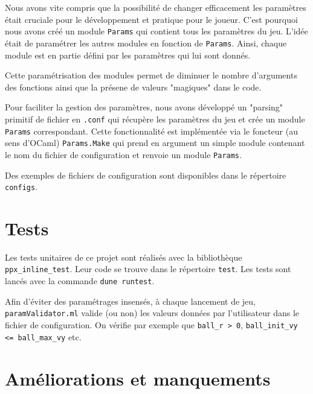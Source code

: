 \documentclass[french]{template}
\begin{document}
Nous avons vite compris que la possibilité de changer efficacement les paramètres était cruciale pour le développement et pratique pour le joueur. C'est pourquoi nous avons créé un module \texttt{Params} qui contient tous les paramètres du jeu. L'idée était de paramétrer les autres modules en fonction de \texttt{Params}. Ainsi, chaque module est en partie défini par les paramètres qui lui sont donnés.

Cette paramétrisation des modules permet de diminuer le nombre d'arguments des fonctions ainsi que la présene de valeurs "magiques" dans le code.

Pour faciliter la gestion des paramètres, nous avons développé un "parsing" primitif de fichier en \texttt{.conf} qui récupère les paramètres du jeu et crée un module \texttt{Params} correspondant. Cette fonctionnalité est implémentée via le foncteur (au sens d'OCaml) \texttt{Params.Make} qui prend en argument un simple module contenant le nom du fichier de configuration et renvoie un module \texttt{Params}.

Des exemples de fichiers de configuration sont disponibles dans le répertoire \texttt{configs}.

\section{Tests}

Les tests unitaires de ce projet sont réalisés avec la bibliothèque \texttt{ppx\_inline\_test}. Leur code se trouve dans le répertoire \texttt{test}. Les tests sont lancés avec la commande \texttt{dune runtest}.

Afin d'éviter des paramétrages insensés, à chaque lancement de jeu, \texttt{paramValidator.ml} valide (ou non) les valeurs données par l'utilisateur dans le fichier de configuration. On vérifie par exemple que \texttt{ball\_r > 0}, \texttt{ball\_init\_vy <= ball\_max\_vy} etc.

\section{Améliorations et manquements}
\end{document}
